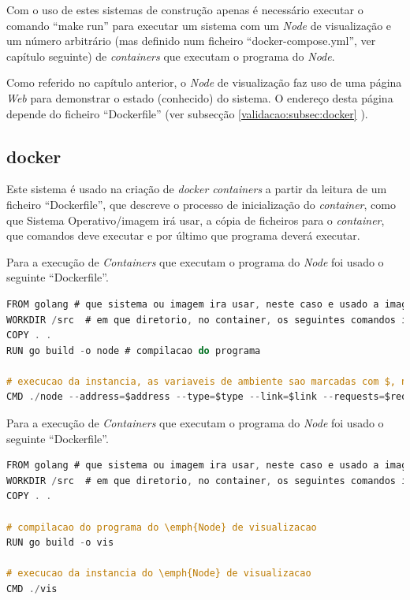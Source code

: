 Com o uso de estes sistemas de construção apenas é necessário executar o comando ``make run'' para executar um sistema com um \emph{Node} de visualização e um número arbitrário (mas definido num ficheiro ``docker-compose.yml'', ver capítulo seguinte) de \emph{containers} que executam o programa do \emph{Node}.

Como referido no capítulo anterior, o \emph{Node} de visualização faz uso de uma página \emph{Web} para demonstrar o estado (conhecido) do sistema. O endereço desta página depende do ficheiro ``Dockerfile'' (ver subsecção 
\ref{validacao:subsec:docker}
).


\subsection*{docker}
\label{validacao:subsec:docker}
Este sistema é usado na criação de \emph{docker containers} a partir da leitura de um ficheiro ``Dockerfile'', que descreve o processo de inicialização do \emph{container}, como que Sistema Operativo/imagem irá usar, a cópia de ficheiros para o \emph{container}, que comandos deve executar e por último que programa deverá executar.


Para a execução de \emph{Containers} que executam o programa do \emph{Node} foi usado o seguinte ``Dockerfile''.
\begin{lstlisting}[caption={``Dockerfile'' do \emph{Node}},language=C]
FROM golang # que sistema ou imagem ira usar, neste caso e usado a imagem ``golang''
WORKDIR /src  # em que diretorio, no container, os seguintes comandos irao ser executados
COPY . .
RUN go build -o node # compilacao do programa

# execucao da instancia, as variaveis de ambiente sao marcadas com $, no entanto serao descritas a sua origem de seguida
CMD ./node --address=$address --type=$type --link=$link --requests=$requests --visualization=$VIS_ADDRESS
\end{lstlisting}
 
Para a execução de \emph{Containers} que executam o programa do \emph{Node} foi usado o seguinte ``Dockerfile''.
\begin{lstlisting}[caption={``Dockerfile'' do \emph{Node}},language=C]
FROM golang # que sistema ou imagem ira usar, neste caso e usado a imagem ``golang''
WORKDIR /src  # em que diretorio, no container, os seguintes comandos irao ser executados
COPY . .

# compilacao do programa do \emph{Node} de visualizacao
RUN go build -o vis

# execucao da instancia do \emph{Node} de visualizacao
CMD ./vis

\end{lstlisting}

